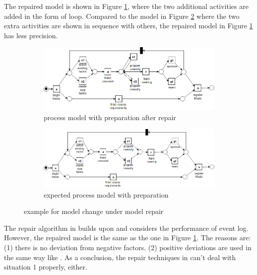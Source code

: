 The repaired model is shown in Figure \ref{fig:model_b1}, where the two additional activities are added in the form of loop.  Compared to the model in Figure \ref{fig:model_b2} where the two extra activities are shown in sequence with others, the repaired model in Figure \ref{fig:model_b1} has less precision.
\begin{figure}[htp]
	\centering
	\begin{subfigure}[b]{\textwidth}
		\centering
		\includegraphics[width=\linewidth]{figures/introduction/Thesis-PN-Example-loop-preparation.png}
		\caption{process model with preparation after repair }
		\label{fig:model_b1}
	\end{subfigure}
	\hfill
	\begin{subfigure}[b]{\textwidth}
		\centering
		\includegraphics[width=1.0\linewidth]{figures/introduction/Thesis-PN-Example-with-preparation.png}
		\caption{expected process model with preparation}
		\label{fig:model_b2}
	\end{subfigure}
	\caption{example for model change under model repair}
	\label{fig:model_with_preparation}
\end{figure}
The repair algorithm in \cite{dees2017enhancing} builds upon \cite{fahland2015model} and considers the performance of event log. However, the repaired model is the same as the one in Figure \ref{fig:model_b1}. The reasons are: (1) there is no deviation from negative factors. (2) positive deviations are used in the same way like \cite{fahland2015model}. As a conclusion, the repair techniques in \cite{dees2017enhancing} can't deal with situation 1 properly, either. 


